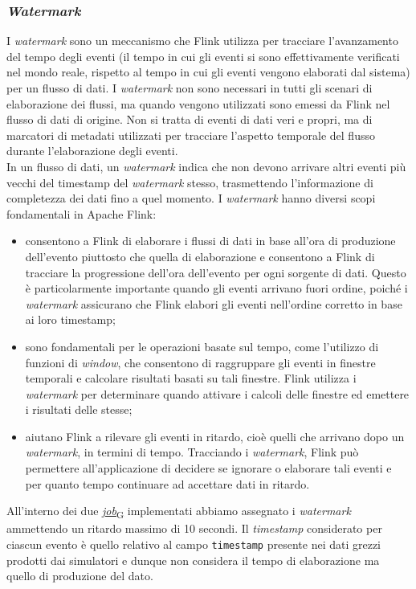 \subsubsection{\textit{Watermark}}\label{watermark}
I \textit{watermark} sono un meccanismo che Flink utilizza per tracciare l'avanzamento del tempo degli eventi
(il tempo in cui gli eventi si sono effettivamente verificati nel mondo reale, rispetto al tempo in cui gli eventi vengono elaborati dal sistema)
per un flusso di dati. I \textit{watermark} non sono necessari in tutti gli scenari di elaborazione dei flussi,
ma quando vengono utilizzati sono emessi da Flink nel flusso di dati di origine.
Non si tratta di eventi di dati veri e propri, ma di marcatori di metadati utilizzati per tracciare l'aspetto temporale del flusso durante l'elaborazione degli eventi.\\
In un flusso di dati, un \textit{watermark} indica che non devono arrivare altri eventi più vecchi del timestamp del \textit{watermark} stesso,
trasmettendo l'informazione di completezza dei dati fino a quel momento.
I \textit{watermark} hanno diversi scopi fondamentali in Apache Flink:
\begin{itemize}
	\item consentono a Flink di elaborare i flussi di dati in base all'ora di produzione dell'evento piuttosto che quella di elaborazione e consentono a Flink
	      di tracciare la progressione dell'ora dell'evento per ogni sorgente di dati. Questo è particolarmente importante quando gli eventi arrivano fuori ordine,
	      poiché i \textit{watermark} assicurano che Flink elabori gli eventi nell'ordine corretto in base ai loro timestamp;
	\item sono fondamentali per le operazioni basate sul tempo, come l'utilizzo di funzioni di \textit{window}, che consentono di raggruppare gli eventi in finestre temporali
	      e calcolare risultati basati su tali finestre. Flink utilizza i \textit{watermark} per determinare quando attivare i calcoli delle finestre ed emettere i risultati delle stesse;
	\item aiutano Flink a rilevare gli eventi in ritardo, cioè quelli che arrivano dopo un \textit{watermark}, in termini di tempo.
	      Tracciando i \textit{watermark}, Flink può permettere all'applicazione di decidere se ignorare o elaborare tali eventi e per quanto tempo continuare ad accettare dati in ritardo.
\end{itemize}
All'interno dei due \href{https://7last.github.io/docs/pb/documentazione-interna/glossario\#job}{\textit{job}\textsubscript{G}} implementati abbiamo assegnato i \textit{watermark} ammettendo un ritardo massimo di 10 secondi. Il \textit{timestamp} considerato per
ciascun evento è quello relativo al campo \texttt{timestamp} presente nei dati grezzi prodotti dai simulatori e dunque non considera il tempo di elaborazione ma quello di produzione del dato.

